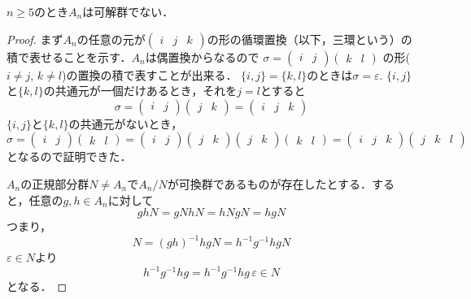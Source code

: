 \begin{Thm}
   $n\ge 5$のとき$A_n$は可解群でない．
\end{Thm}
\begin{proof}
   まず$A_n$の任意の元が$\begin{pmatrix}i&j&k\end{pmatrix}$の形の循環置換（以下，三環という）の積で表せることを示す．$A_n$は偶置換からなるので
   $\sigma=\begin{pmatrix}i&j\end{pmatrix}\begin{pmatrix}k&l\end{pmatrix}$
   の形($i\neq j$, $k\neq l$)の置換の積で表すことが出来る．
   $\{i,j\}=\{k,l\}$のときは$\sigma = \varepsilon$. 
   $\{i,j\}$と$\{k,l\}$の共通元が一個だけあるとき，それを$j=l$とすると
   \[
        \sigma =
        \begin{pmatrix}i&j\end{pmatrix}\begin{pmatrix}j&k\end{pmatrix}
        =\begin{pmatrix}i&j&k\end{pmatrix}
   \]
   $\{i,j\}$と$\{k,l\}$の共通元がないとき，
   \[
        \sigma =
        \begin{pmatrix}i&j\end{pmatrix}\begin{pmatrix}k&l\end{pmatrix}
        =\begin{pmatrix}i&j\end{pmatrix}\begin{pmatrix}j&k\end{pmatrix}
        \begin{pmatrix}j&k\end{pmatrix}\begin{pmatrix}k&l\end{pmatrix}
        =\begin{pmatrix}i&j&k\end{pmatrix}
        \begin{pmatrix}j&k&l\end{pmatrix}
   \]
   となるので証明できた．
   
   $A_n$の正規部分群$N\neq A_n$で$A_n/N$が可換群であるものが存在したとする．すると，任意の$g, h\in A_n$に対して
   \[
        ghN=gNhN=hNgN=hgN
   \]
   つまり，
   \[
        N= (gh)^{-1}hgN=h^{-1}g^{-1}hgN
   \]
   $\varepsilon\in N$より
   \[
        h^{-1}g^{-1}hg=h^{-1}g^{-1}hg\,\varepsilon\in N
   \]
   となる．
   

\end{proof}
